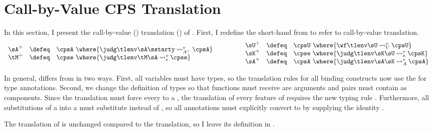 \newcommand{\FigCBVEnv}[1][t] {
  \begin{figure}[#1]
    \CBVEnvRules
    \caption{\cbvname{} of Environments}
    \label{fig:cps:cbv:env}
  \end{figure}
}

\section{Call-by-Value {{CPS}} Translation}
\label{sec:cps:cbv}
In this section, I present the call-by-value ()  translation
(\cbvname{}) of \cpsslang.
First, I redefine the short-hand from  to refer to
call-by-value translation.
\begin{displaymath}
  \begin{array}{rcl}
    \sA^{\div} & \defeq & \cpsA~\where{\cbvAdiv{\slenv}{\sA}{\sstarty}{\cpsA}} \\
    \se^{\div} & \defeq & \cpse~\where{\cbve{\slenv}{\se}{\sA}{\cpse}}
  \end{array}
  \qquad\qquad
  \begin{array}{rcl}
    \sU^{+} & \defeq & \cpsU~\where{\cbvU{\slenv}{\sU}{\cpsU}} \\
    \sK^{+} & \defeq & \cpse~\where{\cbvK{\slenv}{\sK}{\sU}{\cpsK}} \\
    \sA^{+} & \defeq & \cpsA~\where{\cbvA{\slenv}{\sA}{\sK}{\cpsA}} \\
  \end{array}
\end{displaymath}

In general, \cbvname{} differs from \cbnname{} in two ways.
First, all  variables must have  types, so the
translation rules for all binding constructs now use the  for type annotations.
Second, we change the definition of  types so that functions must receive
 are arguments and pairs must contain  as components.
Since the translation must force every  to a , the
translation of every feature of  requires the new typing rule
.
Furthermore, all substitutions of a  into a  must
substitute \emph{} instead of , so all
 annotations must explicitly convert  to
 by supplying the identity .

The translation of  is unchanged compared to the 
translation, so I leave its definition in 
.

